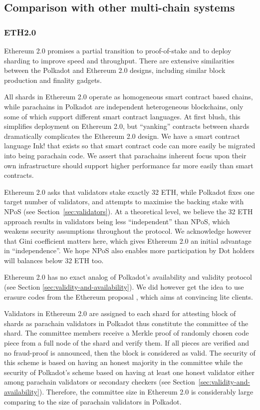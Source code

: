 \documentclass{article}
\begin{document}
\begin{appendix}
\subsection{Comparison with other multi-chain systems}\label{sec:comparison}
\subsubsection{ETH2.0}
Ethereum 2.0 promises a partial transition to proof-of-stake and to deploy sharding to improve speed and throughput.  There are extensive similarities between the Polkadot and Ethereum 2.0 designs, including similar block production and finality gadgets.  

All shards in Ethereum 2.0 operate as homogeneous smart contract based chains, while parachains in Polkadot are independent heterogeneous blockchains, only some of which support different smart contract languages.  
At first blush, this simplifies deployment on Ethereum 2.0, but ``yanking'' contracts between shards dramatically complicates the Ethereum 2.0 design.  We have a smart contract language Ink! that exists so that smart contract code can more easily be migrated into being parachain code.  We assert that parachains inherent focus upon their own infrastructure should support higher performance far more easily than smart contracts.

Ethereum 2.0 asks that validators stake exactly 32 ETH, while Polkadot fixes one target number of validators, and attempts to maximise the backing stake with NPoS (see Section~\ref{sec:validators}).  At a theoretical level, we believe the 32 ETH approach results in validators being less ``independent'' than NPoS, which weakens security assumptions throughout the protocol.  We acknowledge however that Gini coefficient matters here, which gives Ethereum 2.0 an initial advantage in ``independence''.  We hope NPoS also enables more participation by Dot holders will balances below 32 ETH too.

Ethereum 2.0 has no exact analog of Polkadot's availability and validity protocol (see Section \ref{sec:validity-and-availability}).  We did however get the idea to use erasure codes from the Ethereum proposal \cite{availabilityETH2}, which aims at convincing lite clients.  

Validators in Ethereum 2.0 are assigned to each shard for attesting block of shards as parachain validators in Polkadot thus constitute the committee of the shard. The committee members receive a Merkle proof of randomly chosen code piece from a full node of the shard and verify them. If all pieces are verified and no fraud-proof is announced, then the block is considered as valid. The security of this scheme is based on having an honest majority in the committee while the security of Polkadot's scheme based on having at least one honest validator either among parachain validators or secondary checkers (see Section~\ref{sec:validity-and-availability}). Therefore, the committee size in Ethereum 2.0 is considerably large comparing to the size of parachain validators in Polkadot. 




\end{appendix}
\end{document}
